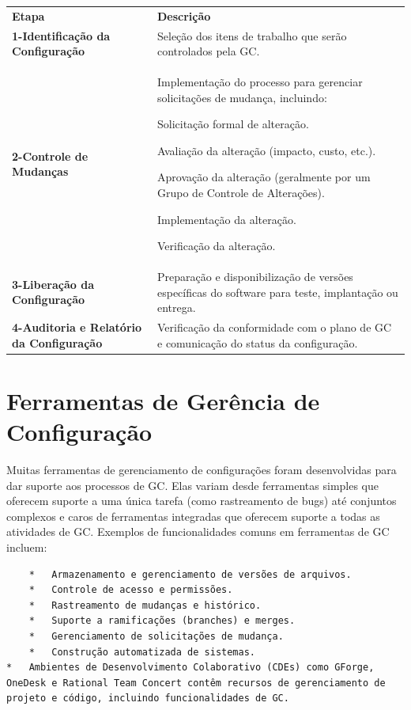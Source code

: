 \documentclass[
]{book}
\begin{document}
\begin{longtable}[]{@{}
  >{\raggedright\arraybackslash}p{}
  >{\raggedright\arraybackslash}p{}@{}}
\toprule\noalign{}
\endhead
\bottomrule\noalign{}
\endlastfoot
\textbf{Etapa} & \textbf{Descrição} \\
\textbf{1-Identificação da Configuração} & Seleção dos itens de trabalho que serão controlados pela GC. \\
\textbf{2-Controle de Mudanças} & Implementação do processo para gerenciar solicitações de mudança, incluindo:

Solicitação formal de alteração.

Avaliação da alteração (impacto, custo, etc.).

Aprovação da alteração (geralmente por um Grupo de Controle de Alterações).

Implementação da alteração.

Verificação da alteração. \\
\textbf{3-Liberação da Configuração} & Preparação e disponibilização de versões específicas do software para teste, implantação ou entrega. \\
\textbf{4-Auditoria e Relatório da Configuração} & Verificação da conformidade com o plano de GC e comunicação do status da configuração. \\
\end{longtable}

\section{Ferramentas de Gerência de Configuração}\label{ferramentas-de-geruxeancia-de-configurauxe7uxe3o}

Muitas ferramentas de gerenciamento de configurações foram desenvolvidas para dar suporte aos processos de GC. Elas variam desde ferramentas simples que oferecem suporte a uma única tarefa (como rastreamento de bugs) até conjuntos complexos e caros de ferramentas integradas que oferecem suporte a todas as atividades de GC. Exemplos de funcionalidades comuns em ferramentas de GC incluem:

\begin{verbatim}
    *   Armazenamento e gerenciamento de versões de arquivos.
    *   Controle de acesso e permissões.
    *   Rastreamento de mudanças e histórico.
    *   Suporte a ramificações (branches) e merges.
    *   Gerenciamento de solicitações de mudança.
    *   Construção automatizada de sistemas.
*   Ambientes de Desenvolvimento Colaborativo (CDEs) como GForge, OneDesk e Rational Team Concert contêm recursos de gerenciamento de projeto e código, incluindo funcionalidades de GC.
\end{verbatim}
\end{document}
